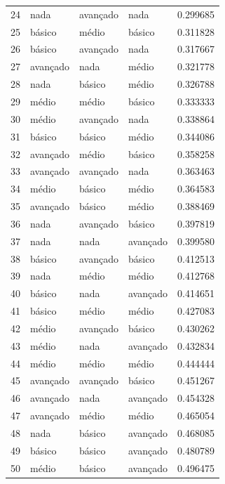 \documentclass[]{article}
\begin{document}
\begin{longtable}{|llll|r|}
		24 & nada      & avançado & nada      & 0.299685     \\
		25 & básico   & médio    & básico   & 0.311828     \\
		26 & básico   & avançado & nada      & 0.317667     \\
		27 & avançado & nada      & médio    & 0.321778     \\
		28 & nada      & básico   & médio    & 0.326788     \\
		29 & médio    & médio    & básico   & 0.333333     \\
		30 & médio    & avançado & nada      & 0.338864     \\
		31 & básico   & básico   & médio    & 0.344086     \\
		32 & avançado & médio    & básico   & 0.358258     \\
		33 & avançado & avançado & nada      & 0.363463     \\
		34 & médio    & básico   & médio    & 0.364583     \\
		35 & avançado & básico   & médio    & 0.388469     \\
		36 & nada      & avançado & básico   & 0.397819     \\
		37 & nada      & nada      & avançado & 0.399580     \\
		38 & básico   & avançado & básico   & 0.412513     \\
		39 & nada      & médio    & médio    & 0.412768     \\
		40 & básico   & nada      & avançado & 0.414651     \\
		41 & básico   & médio    & médio    & 0.427083     \\
		42 & médio    & avançado & básico   & 0.430262     \\
		43 & médio    & nada      & avançado & 0.432834     \\
		44 & médio    & médio    & médio    & 0.444444     \\
		45 & avançado & avançado & básico   & 0.451267     \\
		46 & avançado & nada      & avançado & 0.454328     \\
		47 & avançado & médio    & médio    & 0.465054     \\
		48 & nada      & básico   & avançado & 0.468085     \\
		49 & básico   & básico   & avançado & 0.480789     \\
		50 & médio    & básico   & avançado & 0.496475     \\

\end{longtable}
\end{document}
